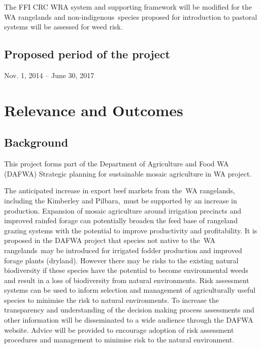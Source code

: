\documentclass[version=last,
    paper=a4, %
    10pt, %
    usenames,
    dvipsnames,
    oneside, %
    headings=openany, %
    DIV=15 %
]{scrbook}
\begin{document}
The FFI CRC WRA system and supporting framework will be modified for the
WA rangelands and non-indigenous~species proposed for introduction to
pastoral systems will be assessed for weed risk.


\subsection*{Proposed period of the project}
Nov. 1, 2014 -- June 30, 2017



\section*{Relevance and Outcomes}

\subsection*{Background}
This project forms part of the Department of Agriculture and Food WA
(DAFWA) Strategic planning for sustainable mosaic agriculture in WA
project.

The anticipated increase in export beef markets from the~WA rangelands,
including the Kimberley and Pilbara,~must be supported by an increase in
production. Expansion of mosaic agriculture around irrigation precincts
and improved rainfed forage can potentially broaden the feed base of
rangeland grazing systems with the potential to improve productivity and
profitability. It is proposed in the DAFWA project that species not
native to the~WA rangelands~may be introduced for irrigated fodder
production and improved forage plants (dryland). However there may be
risks to the existing natural biodiversity if these species have the
potential to become environmental weeds and result in a loss of
biodiversity from natural environments. Risk assessment systems can be
used to inform selection and management of agriculturally useful species
to minimise the risk to natural environments. To increase the
transparency and understanding of the decision making process
assessments and other information will be disseminated to a wide
audience through the DAFWA website. Advice will be provided to encourage
adoption of risk assessment procedures and management to minimise risk
to the natural environment.
\end{document}
